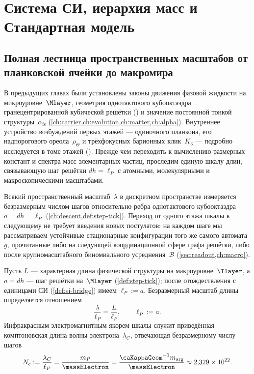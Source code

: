 \chapter{Система СИ, иерархия масс и Стандартная модель}
\label{ch:si-sm}

\section{Полная лестница пространственных масштабов от планковской ячейки до макромира}
\label{sec:full-ladder}

В предыдущих главах были установлены законы движения фазовой жидкости на микроуровне~$\Mlayer$,
геометрия однотактового кубооктаэдра гранецентрированной кубической решётки (\latGCKshort)
и значение постоянной тонкой структуры~$\alpha_{\mathrm{fs}}$ (\cref{ch:carrier,ch:evolution,ch:matter,ch:alpha}).
Внутреннее устройство возбуждений первых этажей --- одиночного планкона, его надпорогового ореола~$\rho_\Theta$
и трёхфокусных барионных клик~$K_3$ --- подробно исследуется в томе этажей
().
Прежде чем переходить к вычислению размерных констант и спектра масс элементарных частиц,
проследим единую шкалу длин, связывающую шаг решётки $dh=\ell_P$ с атомными, молекулярными и макроскопическими масштабами.

Всякий пространственный масштаб~$\lambda$ в дискретном пространстве измеряется безразмерным числом шагов
относительно ребра однотактового кубооктаэдра $a = dh = \ell_P$ (\cref{ch:descent,def:step-tick}).
Переход от одного этажа шкалы к следующему не требует введения новых постулатов:
на каждом шаге мы рассматриваем устойчивые стационарные конфигурации того же самого автомата~$g$,
прочитанные либо на следующей координационной сфере графа решётки, либо после крупномасштабного биномиального усреднения~$\mathcal{B}$ (\cref{sec:readout,ch:macro}).

\begin{definition}
\label{def:hop-count}
Пусть $L$ --- характерная длина физической структуры на макроуровне~$\Tlayer$, а $a = dh$ --- шаг решётки на~$\Mlayer$ (\cref{def:step-tick}); после отождествления с единицами СИ (\cref{def:si-bridge}) имеем $\ell_P := a$.
Безразмерный масштаб длины определяется отношением
\begin{equation}
  \frac{\lambda}{\ell_P}
  = \frac{L}{\ell_P},\qquad
  \ell_P := a.
\end{equation}
Инфракрасным электромагнитным якорем шкалы служит приведённая комптоновская длина волны электрона~$\lambda_C$,
отвечающая безразмерному числу шагов
\[
  N_c := \frac{\lambda_C}{\ell_P} = \frac{m_P}{\massElectron} = \frac{\caKappaGeom^{-1} m_{\arg}}{\massElectron} \approx 2{,}379\times 10^{22}.
\]
\end{definition}

